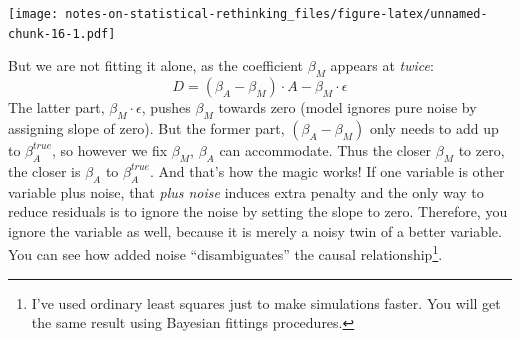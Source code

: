 \documentclass[
]{book}
\begin{document}
\texttt{[image: notes-on-statistical-rethinking\_files/figure-latex/unnamed-chunk-16-1.pdf]}

But we are not fitting it alone, as the coefficient \(\beta_M\) appears at \emph{twice}:
\[D = (\beta_A  - \beta_M) \cdot A - \beta_M \cdot \epsilon\]
The latter part, \(\beta_M \cdot \epsilon\), pushes \(\beta_M\) towards zero (model ignores pure noise by assigning slope of zero). But the former part, \((\beta_A - \beta_M)\) only needs to add up to \(\beta_A^{true}\), so however we fix \(\beta_M\), \(\beta_A\) can accommodate. Thus the closer \(\beta_M\) to zero, the closer is \(\beta_A\) to \(\beta_A^{true}\). And that's how the magic works! If one variable is other variable plus noise, that \emph{plus noise} induces extra penalty and the only way to reduce residuals is to ignore the noise by setting the slope to zero. Therefore, you ignore the variable as well, because it is merely a noisy twin of a better variable. You can see how added noise ``disambiguates'' the causal relationship\footnote{I've used ordinary least squares just to make simulations faster. You will get the same result using Bayesian fittings procedures.}.
\end{document}
